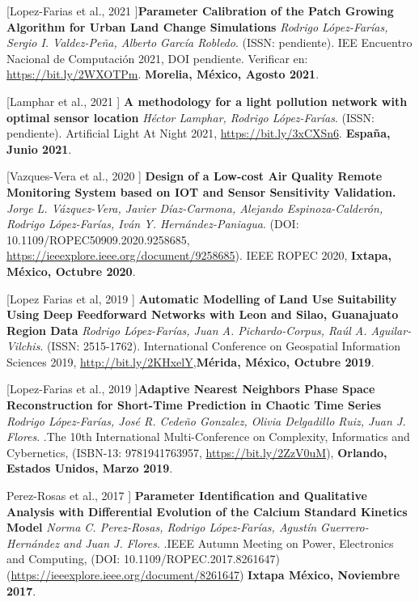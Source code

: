 \begin{innerlist}

\item [[Lopez-Farias et al., 2021]]\textbf{Parameter Calibration of the Patch Growing Algorithm for Urban Land Change Simulations} \textit{Rodrigo López-Farías, Sergio I. Valdez-Peña, Alberto García Robledo}. (ISSN: pendiente). {IEE Encuentro Nacional de Computación 2021}, DOI pendiente.  Verificar en: \url{https://bit.ly/2WXOTPm}. \textbf{Morelia, México, Agosto 2021}. 

\item [[Lamphar et al., 2021]] \textbf{A methodology for a light pollution network with optimal sensor location} \textit{Héctor Lamphar, Rodrigo López-Farías}. (ISSN: pendiente). {Artificial Light At Night 2021},  \url{https://bit.ly/3xCXSn6}.  \textbf{España, Junio 2021}. 

\item [[Vazques-Vera et al., 2020]] \textbf{Design of a Low-cost Air Quality Remote Monitoring System based on IOT and Sensor Sensitivity Validation.} \textit{Jorge L. Vázquez-Vera, Javier Díaz-Carmona, Alejando Espinoza-Calderón, Rodrigo López-Farías, Iván Y. Hernández-Paniagua}. (DOI: 10.1109/ROPEC50909.2020.9258685, \url{https://ieeexplore.ieee.org/document/9258685}). {IEEE ROPEC 2020}, \textbf{Ixtapa, México, Octubre 2020}. 



\item [[Lopez Farias et al, 2019]] \textbf{Automatic Modelling of Land Use Suitability Using Deep Feedforward Networks with Leon and
Silao, Guanajuato Region Data} \textit{Rodrigo López-Farías, Juan A. Pichardo-Corpus, Raúl A. Aguilar-Vilchis}. (ISSN: 2515-1762). {International Conference on Geospatial Information Sciences 2019}, \url{http://bit.ly/2KHxelY},\textbf{Mérida, México, Octubre 2019}. 

\item [[Lopez-Farias et al., 2019]]\textbf{Adaptive Nearest Neighbors Phase Space Reconstruction for Short-Time Prediction in Chaotic Time Series} \textit{Rodrigo López-Farías, José R. Cedeño Gonzalez, Olivia Delgadillo Ruiz, Juan J. Flores}.  .{The 10th International Multi-Conference on Complexity, Informatics and Cybernetics}, (ISBN-13: 9781941763957, \url{https://bit.ly/2ZzV0uM}), \textbf{Orlando, Estados Unidos, Marzo 2019}.


\item [Perez-Rosas et al., 2017]] \textbf{Parameter Identification and Qualitative Analysis with Differential Evolution of the Calcium Standard Kinetics Model} \textit{Norma C. Perez-Rosas, Rodrigo López-Farías, Agustín Guerrero-Hernández and Juan J. Flores}.  .{IEEE Autumn Meeting on Power, Electronics and Computing}, (DOI: 10.1109/ROPEC.2017.8261647) (\url{https://ieeexplore.ieee.org/document/8261647}) \textbf{Ixtapa México, Noviembre 2017}.



\end{innerlist}
